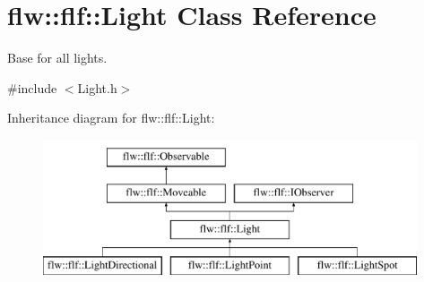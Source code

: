\hypertarget{classflw_1_1flf_1_1Light}{}\section{flw\+:\+:flf\+:\+:Light Class Reference}
\label{classflw_1_1flf_1_1Light}


Base for all lights.  




{\ttfamily \#include $<$Light.\+h$>$}

Inheritance diagram for flw\+:\+:flf\+:\+:Light\+:\begin{figure}[H]
\begin{center}
\leavevmode
\includegraphics[height=4.000000cm]{classflw_1_1flf_1_1Light}
\end{center}
\end{figure}
